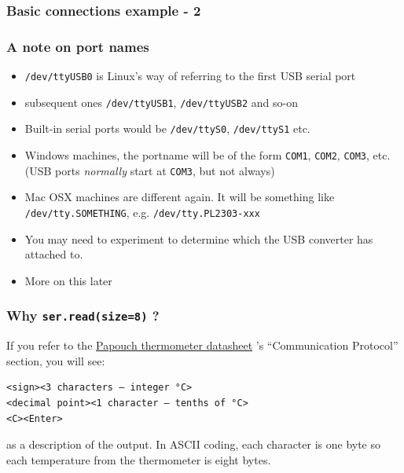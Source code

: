 \documentclass[aspectratio=1610,9pt]{beamer} %
\begin{document}
\begin{frame}[fragile]
\frametitle{Basic connections example - 2}

\subsubsection{A note on port names}

\begin{itemize}
\itemsep1pt\parskip0pt
\item
  \texttt{/dev/ttyUSB0} is Linux's way of referring to the first USB
  serial port
\item
  subsequent ones \texttt{/dev/ttyUSB1}, \texttt{/dev/ttyUSB2} and so-on
\item
  Built-in serial ports would be \texttt{/dev/ttyS0},
  \texttt{/dev/ttyS1} etc.
\item
  Windows machines, the portname will be of the form \texttt{COM1},
  \texttt{COM2}, \texttt{COM3}, etc. (USB ports \emph{normally} start at
  \texttt{COM3}, but not always)
\item
  Mac OSX machines are different again. It will be something like
  \texttt{/dev/tty.SOMETHING}, e.g. \texttt{/dev/tty.PL2303-xxx}
\item
  You may need to experiment to determine which the USB converter has
  attached to.
\item
  More on this later
\end{itemize}

\subsubsection{Why \texttt{ser.read(size=8)}
?}

If you refer to the
\href{http://www.papouch.com/en/shop/product/tm-rs232-thermometer/tm_en.pdf}{Papouch
thermometer datasheet} 's ``Communication Protocol'' section, you will
see:

\begin{verbatim}
<sign><3 characters – integer °C>
<decimal point><1 character – tenths of °C>
<C><Enter>
\end{verbatim}

as a description of the output. In ASCII coding, each character is one
byte so each temperature from the thermometer is eight bytes.

\end{frame}
\end{document}
